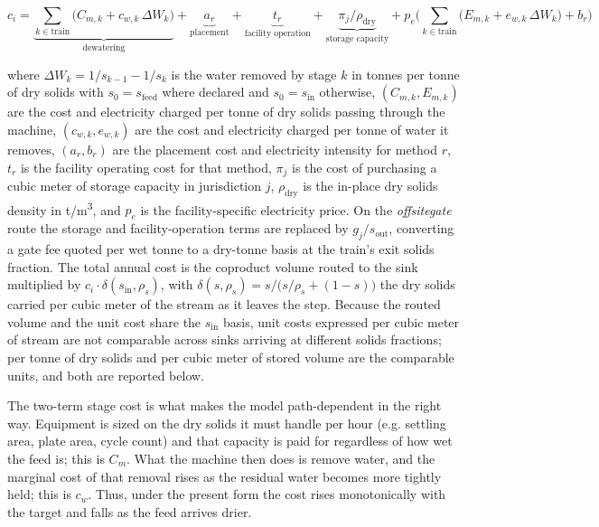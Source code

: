 \documentclass{article}
\renewcommand\_{\textunderscore\allowbreak}
\begin{document}
\begin{equation}
    c_i = \underbrace{\sum_{k \in \text{train}} \big( C_{m,k} + c_{w,k}\,\Delta W_k \big)}_{\text{dewatering}}
        + \underbrace{a_r}_{\text{placement}}
        + \underbrace{t_r}_{\text{facility operation}}
        + \underbrace{\pi_j / \rho_{\text{dry}}}_{\text{storage capacity}}
        + p_e \bigg( \sum_{k \in \text{train}} \big( E_{m,k} + e_{w,k}\,\Delta W_k \big) + b_r \bigg)
    \label{eq:c-tailings}
\end{equation}

\noindent where $\Delta W_k = 1/s_{k-1} - 1/s_k$ is the water removed by stage $k$ in tonnes per tonne of dry solids with $s_0= s_{\text{feed}}$ where declared and $s_0=s_{\text{in}}$ otherwise, $(C_{m,k}, E_{m,k})$ are the cost and electricity charged per tonne of dry solids passing through the machine, $(c_{w,k}, e_{w,k})$ are the cost and electricity charged per tonne of water it removes, $(a_r, b_r)$ are the placement cost and electricity intensity for method $r$, $t_r$ is the facility operating cost for that method, $\pi_j$ is the cost of purchasing a cubic meter of storage capacity in jurisdiction $j$, $\rho_{\text{dry}}$ is the in-place dry solids density in \si{t/m^3}, and $p_e$ is the facility-specific electricity price. On the \textit{offsite\_gate} route the storage and facility-operation terms are replaced by $g_j / s_{\text{out}}$, converting a gate fee quoted per wet tonne to a dry-tonne basis at the train's exit solids fraction. The total annual cost is the coproduct volume routed to the sink multiplied by $c_i \cdot \delta(s_{\text{in}}, \rho_s)$, with $\delta(s, \rho_s) = s / \big(s/\rho_s + (1-s)\big)$ the dry solids carried per cubic meter of the stream as it leaves the step. Because the routed volume and the unit cost share the $s_{\text{in}}$ basis, unit costs expressed per cubic meter of stream are not comparable across sinks arriving at different solids fractions; per tonne of dry solids and per cubic meter of stored volume are the comparable units, and both are reported below.

The two-term stage cost is what makes the model path-dependent in the right way. Equipment is sized on the dry solids it must handle per hour (e.g. settling area, plate area, cycle count) and that capacity is paid for regardless of how wet the feed is; this is $C_m$. What the machine then does is remove water, and the marginal cost of that removal rises as the residual water becomes more tightly held; this is $c_w$. Thus, under the present form the cost rises monotonically with the target and falls as the feed arrives drier.
\end{document}
